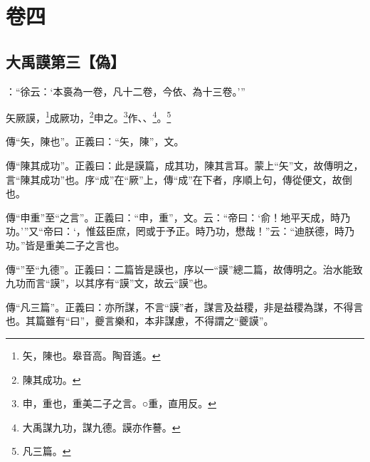 

\chapter{卷四}


\section{大禹謨第三【偽】}


 {\noindent{}\fzbyks {}：“徐云：‘本裛為一卷，凡十二卷，今依、為十三卷。’” \par}

\textcolor{red}{}矢厥謨，\footnote{矢，陳也。皋音高。陶音遙。}成厥功，\footnote{陳其成功。}申之。\footnote{申，重也，重美二子之言。○重，直用反。}作、、\footnote{大禹謀九功，謀九德。謨亦作謩。}\CJKunderwave{\textcolor{red}{益稷}}。\footnote{凡三篇。}

{\noindent\zhuan{}\fzbyks 傳“矢，陳也”。正義曰：“矢，陳”，文。 \par}

{\noindent\zhuan{}\fzbyks 傳“陳其成功”。正義曰：此是謨篇，成其功，陳其言耳。蒙上“矢”文，故傳明之，言“陳其成功”也。序“成”在“厥”上，傳“成”在下者，序順上句，傳從便文，故倒也。 \par}

{\noindent\zhuan{}\fzbyks 傳“申重”至“之言”。正義曰：“申，重”，文。云：“帝曰：‘俞！地平天成，時乃功。’”又“帝曰：‘，惟茲臣庶，罔或于予正。時乃功，懋哉！”云：“迪朕德，時乃功。”皆是重美二子之言也。 \par}

{\noindent\zhuan{}\fzbyks 傳“”至“九德”。正義曰：二篇皆是謨也，序以一“謨”總二篇，故傳明之。治水能致九功而言“謨”，以其序有“謨”文，故云“謨”也。 \par}

{\noindent\zhuan{}\fzbyks 傳“凡三篇”。正義曰：亦所謀，不言“謨”者，謀言及益稷，非是益稷為謀，不得言也。其篇雖有“曰”，夔言樂和，本非謀慮，不得謂之“夔謨”。 \par}

